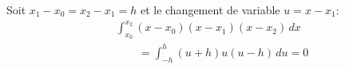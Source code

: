 \documentclass[leqno]{amsart}
\begin{document}
\centering
Soit $x_1-x_0 = x_2-x_1 = h$ et le changement de variable $u=x-x_1$:
\begin{align*}
    &\int_{x_0}^{x_2} (x-x_0)(x-x_1)(x-x_2)\,dx\\
    &\qquad = \int_{-h}^h (u+h)u(u-h)\,du = 0
\end{align*}
\end{document}
